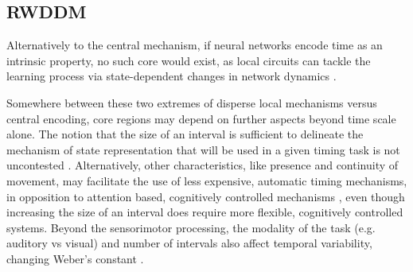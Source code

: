     \subsection{RWDDM}
    
    
    
    
    
    
            Alternatively to the central mechanism, if neural networks encode time as an intrinsic property, no such core would exist, as local circuits can tackle the learning process via state-dependent changes in network dynamics \cite{mauk2004neural, paton2018neural, buonomano1995temporal, motanis2018short}. 
        
        Somewhere between these two extremes of disperse local mechanisms versus central encoding, core regions may depend on further aspects beyond time scale alone. The notion that the size of an interval is sufficient to delineate the mechanism of state representation that will be used in a given timing task is not uncontested \cite{van20168}. Alternatively, other characteristics, like presence and continuity of movement, may facilitate the use of less expensive, automatic timing mechanisms, in opposition to attention based, cognitively controlled mechanisms \cite{lewis2003distinct}, even though increasing the size of an interval does require more flexible, cognitively controlled systems. Beyond the sensorimotor processing, the modality of the task (e.g. auditory vs visual) and number of intervals also affect temporal variability, changing Weber's constant \cite{merchant2008we}.